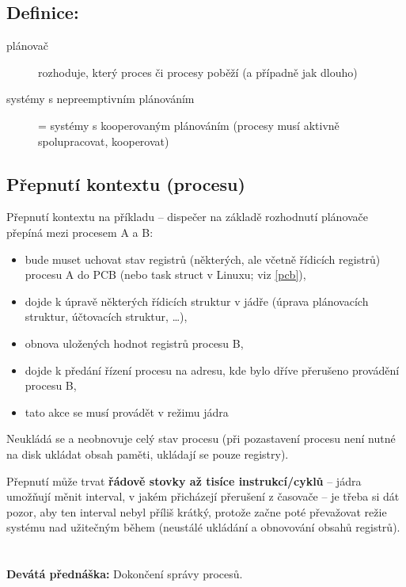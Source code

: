 \documentclass[a4paper, 11pt]{article}
\begin{document}
\subsection*{Definice:}
\begin{description}
\item[plánovač] rozhoduje, který proces či procesy poběží (a případně jak dlouho)
\item[systémy s nepreemptivním plánováním] = systémy s kooperovaným plánováním (procesy musí aktivně spolupracovat, kooperovat)
\end{description}

\subsection{Přepnutí kontextu (procesu)}
Přepnutí kontextu na příkladu -- dispečer na základě rozhodnutí plánovače přepíná mezi procesem A a B:
\begin{itemize}
    \item bude muset uchovat stav registrů (některých, ale včetně řídicích registrů) procesu A do PCB (nebo task struct v Linuxu; viz \ref{pcb}),
    \item dojde k úpravě některých řídicích struktur v jádře (úprava plánovacích struktur, účtovacích struktur, \ldots),
    \item obnova uložených hodnot registrů procesu B,
    \item dojde k předání řízení procesu na adresu, kde bylo dříve přerušeno provádění procesu B,
    \item tato akce se musí provádět v režimu jádra
\end{itemize}
 
Neukládá se a neobnovuje celý stav procesu (při pozastavení procesu není nutné na disk ukládat obsah paměti, ukládají se pouze registry).
 
Přepnutí může trvat \textbf{řádově stovky až tisíce instrukcí/cyklů} -- jádra umožňují měnit interval, v jakém přicházejí přerušení z časovače -- je třeba si dát pozor, aby ten interval nebyl příliš krátký, protože začne poté převažovat režie systému nad užitečným během (neustálé ukládání a obnovování obsahů registrů).

\newpage

\section{}
\textbf{Devátá přednáška:} Dokončení správy procesů.
\end{document}
